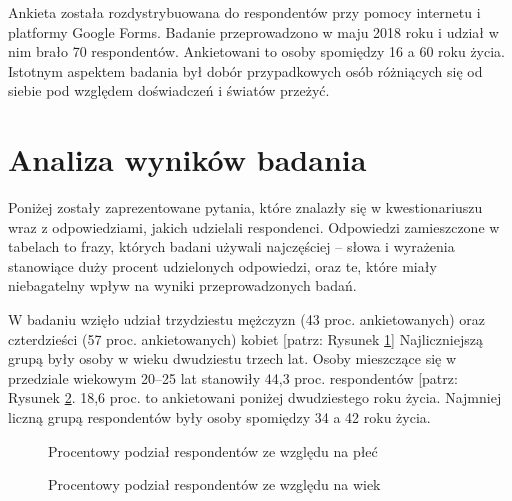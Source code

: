 \documentclass[12pt, a4paper, titlepage]{report}
\begin{document}
Ankieta została rozdystrybuowana do respondentów przy pomocy internetu i platformy Google Forms. Badanie przeprowadzono w maju 2018 roku i udział w nim brało 70 respondentów. Ankietowani to osoby spomiędzy 16 a 60 roku życia. Istotnym aspektem badania był dobór przypadkowych osób różniących się od siebie pod względem doświadczeń i światów przeżyć. 

\section{Analiza wyników badania}
Poniżej zostały zaprezentowane pytania, które znalazły się w kwestionariuszu wraz z odpowiedziami, jakich udzielali respondenci. Odpowiedzi zamieszczone w tabelach to frazy, których badani używali najczęściej -- słowa i wyrażenia stanowiące duży procent udzielonych odpowiedzi, oraz te, które miały niebagatelny wpływ na wyniki przeprowadzonych badań. 

W badaniu wzięło udział trzydziestu mężczyzn (43 proc. ankietowanych) oraz czterdzieści (57 proc. ankietowanych) kobiet [patrz: Rysunek \ref{Wykres1}] Najliczniejszą grupą były osoby w wieku dwudziestu trzech lat. Osoby mieszczące się w przedziale wiekowym 20--25 lat stanowiły 44,3 proc. respondentów [patrz: Rysunek \ref{Wykr}. 18,6 proc. to ankietowani poniżej dwudziestego roku życia. Najmniej liczną grupą respondentów były osoby spomiędzy 34 a 42 roku życia. 

\newpage
\begin{figure}[!htb]
\centering
{}
\caption{Procentowy podział respondentów ze względu na płeć}
\label{Wykres1}
\end{figure}

\begin{figure}[!htb]
     \centering
     \mydata

     \caption{Procentowy podział respondentów ze względu na wiek}
     \label{Wykr}
    \end{figure}
\end{document}

